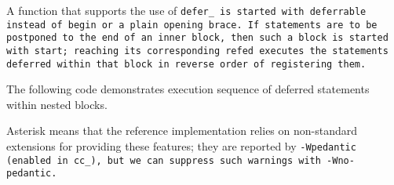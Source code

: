 A function that supports the use of \tt{defer_} is started with
\tt{deferrable} instead of \tt{begin} or a plain opening brace.
If statements are to be postponed to the end of an inner block,
then such a block is started with \tt{start};
reaching its corresponding \tt{refed} executes the statements
deferred within that block in reverse order of registering them.

\example The following code demonstrates execution
sequence of deferred statements within nested blocks.


\note Asterisk means that the reference implementation relies
on non-standard extensions for providing these features;
they are reported by \tt{-Wpedantic} (enabled in \tt{cc_}),
but we can suppress such warnings with \tt{-Wno-pedantic}.

